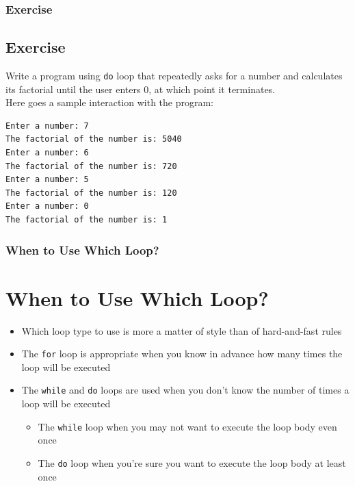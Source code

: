 \documentclass{beamer}
\begin{document}
\begin{frame} [fragile]
    \frametitle{Exercise}
    \subsection{Exercise} %
    \label{subsec:do_exercise}
    Write a program using \texttt{do} loop that repeatedly asks for a number and calculates its factorial until the user enters 0, at which point it terminates. \\ [0.2 in]
    Here goes a sample interaction with the program: \\
    \lstset{style=mystyle}
\begin{lstlisting}
Enter a number: 7
The factorial of the number is: 5040
Enter a number: 6
The factorial of the number is: 720
Enter a number: 5
The factorial of the number is: 120
Enter a number: 0
The factorial of the number is: 1
\end{lstlisting}
\end{frame}

\begin{frame}
    \frametitle{When to Use Which Loop?}
    \section{When to Use Which Loop?} %
    \label{sec:which}
    \begin{itemize}
        \item Which loop type to use is more a matter of style than of hard-and-fast rules
        \item The \texttt{for} loop is appropriate when you know in advance how many times the loop will be executed
        \item The \texttt{while} and \texttt{do} loops are used when you don't know the number of times a loop will be executed
        \begin{itemize}
            \item The \texttt{while} loop when you may not want to execute the loop body even once
            \item The \texttt{do} loop when you're sure you want to execute the loop body at least once
        \end{itemize}
    \end{itemize}
\end{frame}
\end{document}
